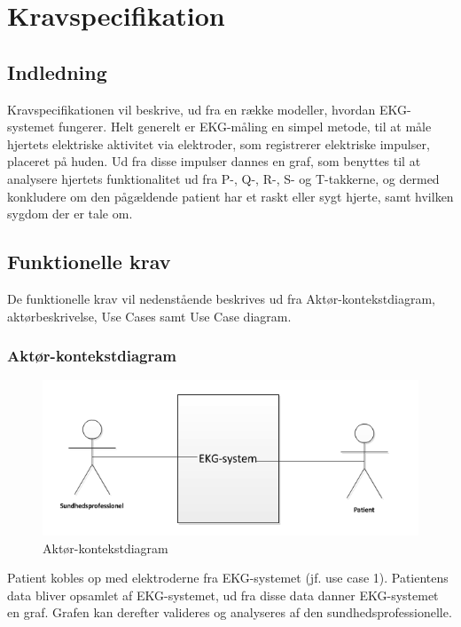 \chapter{Kravspecifikation}

\section{Indledning}
Kravspecifikationen vil beskrive, ud fra en række modeller, hvordan EKG-systemet fungerer. Helt generelt er EKG-måling en simpel metode, til at måle hjertets elektriske aktivitet via elektroder, som registrerer elektriske impulser, placeret på huden. Ud fra disse impulser dannes en graf, som benyttes til at analysere hjertets funktionalitet ud fra P-, Q-, R-, S- og T-takkerne, og dermed konkludere om den pågældende patient har et raskt eller sygt hjerte, samt hvilken sygdom der er tale om.

\section{Funktionelle krav}
De funktionelle krav vil nedenstående beskrives ud fra Aktør-kontekstdiagram, aktørbeskrivelse, Use Cases samt Use Case diagram. 

\subsection{Aktør-kontekstdiagram}

\begin{figure}[htb]
	\centering
	\includegraphics[width=1\textwidth]{Figurer/Snip20150313_4}
	\caption{Aktør-kontekstdiagram}
	\label{fig:aktoerbeskrivelse}
\end{figure}

Patient kobles op med elektroderne fra EKG-systemet (jf. use case 1). Patientens data bliver opsamlet af EKG-systemet, ud fra disse data danner EKG-systemet en graf. Grafen kan derefter valideres og analyseres af den sundhedsprofessionelle. 

